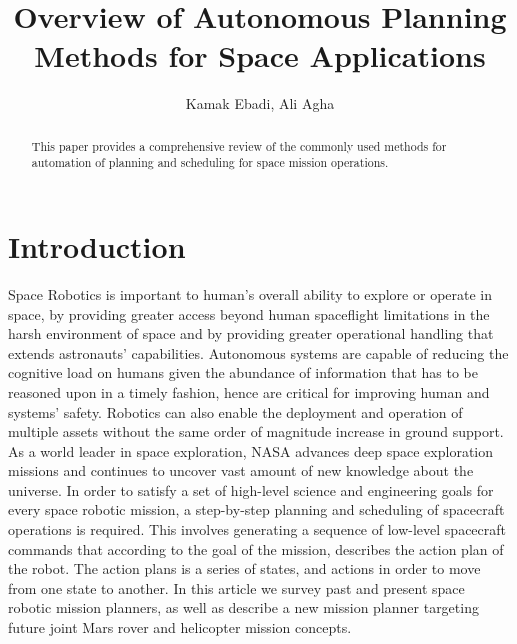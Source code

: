 \documentclass[conference]{IEEEtran}
\begin{document}

\title{\huge Overview of Autonomous Planning Methods for Space Applications}

\author{Kamak Ebadi, Ali Agha}

\maketitle

\begin{abstract}
This paper provides a comprehensive review of the commonly used methods for automation of planning and scheduling for space mission operations.
\end{abstract}

\section{Introduction}
Space Robotics is important to human’s overall ability to explore or operate in space, by providing greater access beyond human spaceflight limitations in the harsh environment of space and by providing greater operational handling that extends astronauts’ capabilities. Autonomous systems are capable of reducing the cognitive load on humans given the abundance of information that has to be reasoned upon in a timely fashion, hence are critical for improving human and systems’ safety. Robotics can also enable the deployment and operation of multiple assets without the same order of magnitude increase in ground support.
As a world leader in space exploration, NASA advances deep space exploration missions and continues to uncover vast amount of new knowledge about the universe.
In order to satisfy a set of high-level science and engineering goals for every space robotic mission, a step-by-step planning and scheduling of spacecraft operations is required. This involves generating a sequence of low-level spacecraft commands that according to the goal of the mission, describes the action plan of the robot. The action plans is a series of states, and actions in order to move from one state to another.
In this article we survey past and present space robotic mission planners, as well as describe a new mission planner targeting future joint Mars rover and helicopter mission concepts.
\end{document}
